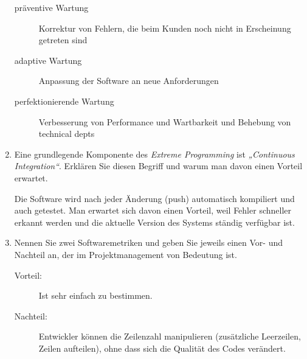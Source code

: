 \documentclass{bschlangaul-aufgabe}
\begin{document}
\begin{enumerate}
\begin{bAntwort}
\begin{description}
\item[präventive Wartung]

Korrektur von Fehlern, die beim Kunden
noch nicht in Erscheinung getreten sind

\item[adaptive Wartung]

Anpassung der Software an neue Anforderungen

\item[perfektionierende Wartung]

Verbesserung von Performance und Wartbarkeit und Behebung von technical
depts
\end{description}
\end{bAntwort}


\item Eine grundlegende Komponente des \emph{Extreme Programming} ist
\emph{„Continuous Integration“}. Erklären Sie diesen Begriff und warum
man davon einen Vorteil erwartet.

\begin{bAntwort}
Die Software wird nach jeder Änderung (push) automatisch kompiliert und
auch getestet. Man erwartet sich davon einen Vorteil, weil Fehler
schneller erkannt werden und die aktuelle Version des Systems ständig
verfügbar ist.
\end{bAntwort}


\item Nennen Sie zwei Softwaremetriken und geben Sie jeweils einen Vor-
und Nachteil an, der im Projektmanagement von Bedeutung
ist.

\begin{bAntwort}

\begin{description}
\item[Vorteil:]

Ist sehr einfach zu bestimmen.

\item[Nachteil:]

Entwickler können die Zeilenzahl manipulieren (zusätzliche Leerzeilen,
Zeilen aufteilen), ohne dass sich die Qualität des Codes verändert.
\end{description}



\end{bAntwort}
\end{enumerate}
\end{document}
